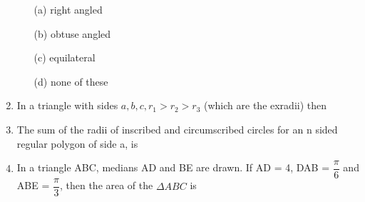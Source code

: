 \documentclass[journal,12pt,twocolumn]{IEEEtran}
\begin{document}
\begin{enumerate}
 \begin{itemize}
 \item[(a)] right angled
 \item[(b)] obtuse angled
 \item[(c)] equilateral
 \item[(d)] none of these
 \end{itemize}
 \item In a triangle with sides $a, b, c, r_1>r_2>r_3$ (which are the exradii) then
 \begin{itemize}
 \end{itemize}
 \item The sum of the radii of inscribed and circumscribed circles for an n sided regular polygon of side a, is
 \begin{itemize}
 \end{itemize}
 \item In a triangle ABC, medians AD and BE are drawn. If AD = 4, \angle DAB = $\dfrac{\pi}{6}$ and \angle ABE = $\dfrac{\pi}{3}$, then the area of the $\Delta ABC$ is
 \begin{itemize}
\end{itemize}
\end{enumerate}
\end{document}
